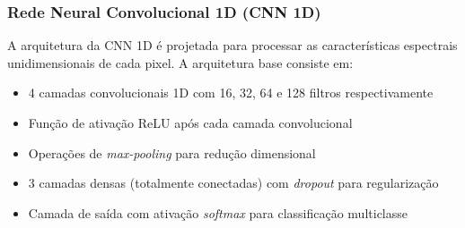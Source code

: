 \subsubsection{Rede Neural Convolucional 1D (CNN 1D)}

A arquitetura da CNN 1D é projetada para processar as características espectrais unidimensionais de cada pixel. A arquitetura base consiste em:

\begin{itemize}
    \item 4 camadas convolucionais 1D com 16, 32, 64 e 128 filtros respectivamente
    \item Função de ativação ReLU após cada camada convolucional
    \item Operações de \textit{max-pooling} para redução dimensional
    \item 3 camadas densas (totalmente conectadas) com \textit{dropout} para regularização \cite{Dropout:asimplewaytopreventneuralnetworksfromoverfitting}
    \item Camada de saída com ativação \textit{softmax} para classificação multiclasse
\end{itemize}

